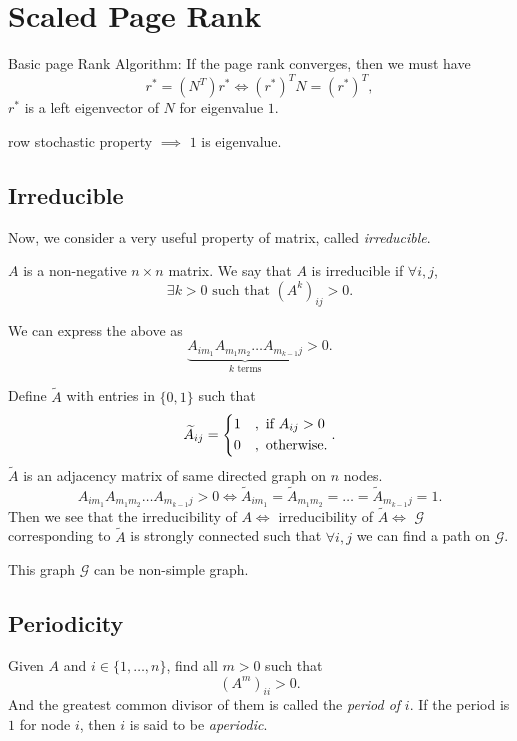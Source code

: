 \chapter{Scaled Page Rank}
\begin{prev}
	Basic page Rank Algorithm: If the page rank converges, then we must have
	\[
		r^{*} = (N^{T})r^{*} \iff (r^{*})^{T} N = (r^{*})^{T},
	\]
	\(r^{*}\) is a left eigenvector of \(N\) for eigenvalue \(1\).
\end{prev}
\begin{remark}
	row stochastic property \(\implies\) \(1\) is eigenvalue.
\end{remark}

\section{Irreducible}
\par Now, we consider a very useful property of matrix, called \emph{irreducible}.
\begin{prev}
	\(A\) is a non-negative \(n\times n\) matrix. We say that \(A\) is irreducible if \(\forall i, j\),
	\[
		\exists k>0 \text{ such that }(A^k)_{ij} > 0.
	\]
\end{prev}
\begin{note}
	We can express the above as
	\[
		\underbrace{A_{im_1} A_{m_{1}m_2} \ldots A_{m_{k-1}j}}_{k\text{ terms}}>0.
	\]
\end{note}
Define \(\widetilde{A}\) with entries in \(\{0, 1\}\) such that
\[
	\widetilde{A}_{ij} = \begin{dcases}
		1 & , \text{ if }A_{ij}>0 \\
		0 & , \text{ otherwise}.
	\end{dcases}.
\]
\(\widetilde{A}\) is an adjacency matrix of same directed graph on \(n\) nodes.
\[
	A_{im_1} A_{m_1 m_2}\ldots A_{m_{k-1} j} > 0 \iff \widetilde{A}_{im_1} = \widetilde{A}_{m_1 m_2} = \ldots = \widetilde{A}_{m_{k-1}j} = 1.
\]
Then we see that the irreducibility of \(A \iff\) irreducibility of \(\widetilde{A}\iff\) \(\mathcal{G}\) corresponding to \(\widetilde{A}\) is strongly connected such that
\(\forall  i, j\) we can find a path on \(\mathcal{G}\).
\begin{remark}
	This graph \(\mathcal{G}\) can be non-simple graph.
\end{remark}

\section{Periodicity}
\begin{definition}
	Given \(A\) and \(i\in\{1, \ldots , n\}\), find all \(m>0\) such that
	\[
		(A^m)_{ii}>0.
	\]
	And the greatest common divisor of them is called the \emph{period of} \(i\). If the period is \(1\) for node \(i\), then
	\(i\) is said to be \emph{aperiodic}.
\end{definition}

